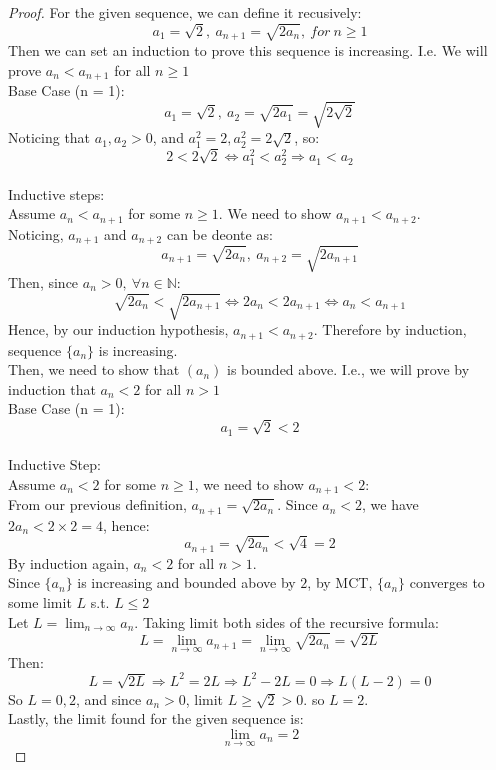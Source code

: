 \documentclass{article}
\begin{document}
\begin{proof}
    For the given sequence, we can define it recusively:
    \[ a_1 = \sqrt{2}, \ a_{n + 1} = \sqrt{2a_n}, \ for \ n \geq 1 \]
    Then we can set an induction to prove this sequence is increasing. I.e. We will prove $a_n < a_{n + 1}$ for all $n \geq 1$
    \\
    Base Case (n = 1):
    \\
    \[ a_1 = \sqrt{2}, \ a_2 = \sqrt{2a_1} = \sqrt{2\sqrt{2}} \]
    Noticing that $a_1, a_2 > 0$, and $a_1^2 = 2, a_2^2 = 2\sqrt{2}$, so:
    \[ 2 < 2\sqrt{2} \Leftrightarrow a_1^2 < a_2^2 \Rightarrow a_1 < a_2 \]
    \\
    Inductive steps:
    \\
    Assume $a_n < a_{n + 1}$ for some $n \geq 1$. We need to show $a_{n + 1} < a_{n + 2}$.
    \\
    Noticing, $a_{n + 1}$ and $a_{n + 2}$ can be deonte as:
    \[ a_{n + 1} = \sqrt{2a_n}, \ a_{n + 2} = \sqrt{2a_{n+1}} \]
    Then, since $a_n > 0, \ \forall n \in \mathbb{N}$:
    \[ \sqrt{2a_n} < \sqrt{2a_{n+1}} \Leftrightarrow 2a_n < 2a_{n+1} \Leftrightarrow a_n < a_{n+1} \]
    Hence, by our induction hypothesis, $a_{n + 1} < a_{n + 2}$. Therefore by induction, sequence $\{a_n\}$ is increasing.
    \\
    Then, we need to show that $(a_n)$ is bounded above. I.e., we will prove by induction that $a_n < 2$ for all $n > 1$
    \\
    Base Case (n = 1):
    \\
    \[ a_1 = \sqrt{2} < 2 \]
    \\
    Inductive Step:
    \\
    Assume $a_n < 2$ for some $n \geq 1$, we need to show $a_{n + 1} < 2$:
    \\
    From our previous definition, $a_{n + 1} = \sqrt{2 a_n}$. 
    Since $a_n < 2$, we have $2a_n < 2 \times 2 = 4$, hence:
    \[ a_{n + 1} = \sqrt{2a_n} < \sqrt{4} = 2 \]
    By induction again, $a_n < 2$ for all $n > 1$.
    \\
    Since $\{a_n \}$ is increasing and bounded above by $2$, by MCT, $\{a_n\}$ converges to some limit $L$ s.t. $L \leq 2$
    \\
    Let $L = \lim_{n \rightarrow \infty} a_n$. Taking limit both sides of the recursive formula:
    \[ L = \lim_{n \rightarrow \infty} a_{n + 1} = \lim_{n \rightarrow \infty} \sqrt{2a_n} = \sqrt{2L} \]
    Then:
    \[ L = \sqrt{2L} \Longrightarrow L^2 = 2L \Longrightarrow L^2 - 2L = 0 \Longrightarrow L(L - 2) = 0 \]
    So $L = 0, 2$, and since $a_n > 0$, limit $L \geq \sqrt{2} > 0$. so $L = 2$.
    \\
    Lastly, the limit found for the given sequence is:
    \[ \lim_{n \rightarrow \infty} a_n = 2 \]    
\end{proof}
\end{document}
